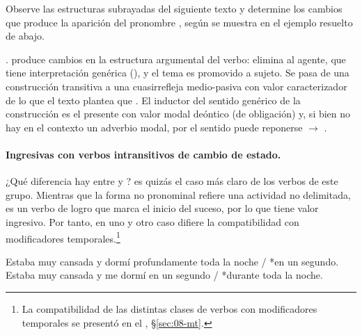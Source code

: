 \begin{ejercicio}\label{ej:10-cocina}
Observe las estructuras subrayadas del siguiente texto y determine los cambios
que produce la aparición del pronombre , según se muestra en el
ejemplo resuelto de abajo.


\begin{resuelto}
.  produce cambios
en la estructura argumental del verbo: elimina al agente, que tiene
interpretación genérica (), y el tema es promovido a sujeto. Se pasa de una construcción
transitiva a una cuasirrefleja medio-pasiva con valor caracterizador de lo que el
texto plantea que . El inductor del sentido
genérico de la construcción es el presente con valor modal deóntico (de
obligación) y, si bien no hay en el contexto un adverbio modal, por el sentido
puede reponerse  $\rightarrow$ .
\end{resuelto}
\end{ejercicio}

\paragraph{Ingresivas con verbos intransitivos de cambio de estado.} ¿Qué
diferencia hay entre  y ?  es quizás
el caso más claro de los verbos de este grupo. Mientras que la forma no
pronominal refiere una actividad no delimitada,  es un verbo de
logro que marca el inicio del suceso, por lo que tiene valor ingresivo. Por
tanto, en uno y otro caso difiere la compatibilidad con modificadores
temporales.\footnote{La compatibilidad de las distintas clases de verbos con
modificadores temporales se presentó en el ,
§\ref{sec:08-mt}.}

\begin{exe}
  \ex
    \begin{xlist}
      \ex Estaba muy cansada y dormí profundamente toda la noche / *en un
          segundo.
      \ex Estaba muy cansada y me dormí en un segundo / *durante toda la noche.
    \end{xlist}
\end{exe}

